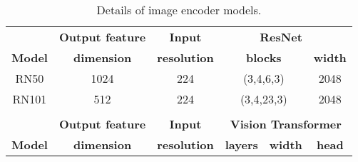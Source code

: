 \documentclass[runningheads]{llncs}
\begin{document}
\begin{table}[t]
\begin{center}
\caption{Details of image encoder models.}
\begin{tabular}{cccccc}
\hline 
& \textbf{Output feature} & \textbf{Input} & \multicolumn{2}{r}{\textbf{ResNet}} &\\
\hspace{1.5pt} \textbf{Model} \hspace{1.5pt}& \hspace{1.5pt} \textbf{dimension} \hspace{1.5pt} & \hspace{1.5pt} \textbf{resolution} \hspace{0.5pt} & \multicolumn{2}{c}{\hspace{0.5pt}\textbf{blocks}\hspace{1.5pt}} & \hspace{1.5pt} \textbf{width} \hspace{1.5pt} \\ \hline 
RN50 & 1024 & 224 & \multicolumn{2}{c}{\hspace{2pt}(3,4,6,3)\hspace{2pt}} & \hspace{1.5pt}2048\hspace{1.5pt} \\
RN101 & 512 & 224 & \multicolumn{2}{c}{\hspace{2pt}(3,4,23,3)\hspace{2pt}} & \hspace{1.5pt}2048\hspace{1.5pt} \\ \hline
\\ \hline
& \textbf{Output feature} & \textbf{Input} & \multicolumn{3}{c}{\textbf{Vision Transformer}} \\
\hspace{1.5pt} \textbf{Model} \hspace{1.5pt}& \hspace{1.5pt} \textbf{dimension} \hspace{1.5pt}& \hspace{1.5pt} \textbf{resolution} \hspace{0.5pt} & \hspace{0.5pt} \textbf{layers} \hspace{1.5pt} & \hspace{1.5pt} \textbf{width} \hspace{1.5pt} & \hspace{1.5pt} \textbf{head} \hspace{1.5pt}\\ \hline 

\end{tabular}
\end{center}
\end{table}
\end{document}
